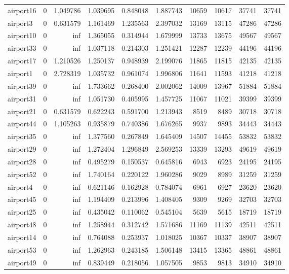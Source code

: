 \begin{longtable}{|l|r|r|r|r|r|r|r|r|r|}
airport16 & 0 & 1.049786 & 1.039695 & 0.848048 & 1.887743 & 10659 & 10617 & 37741 & 37741 \\
airport3 & 0 & 0.631579 & 1.161469 & 1.235563 & 2.397032 & 13169 & 13115 & 47286 & 47286 \\
airport10 & 0 & inf & 1.365055 & 0.314944 & 1.679999 & 13733 & 13675 & 49567 & 49567 \\
airport33 & 0 & inf & 1.037118 & 0.214303 & 1.251421 & 12287 & 12239 & 44196 & 44196 \\
airport17 & 0 & 1.210526 & 1.250137 & 0.948939 & 2.199076 & 11865 & 11815 & 42135 & 42135 \\
airport1 & 0 & 2.728319 & 1.035732 & 0.961074 & 1.996806 & 11641 & 11593 & 41218 & 41218 \\
airport39 & 0 & inf & 1.733662 & 0.268400 & 2.002062 & 14009 & 13967 & 51884 & 51884 \\
airport31 & 0 & inf & 1.051730 & 0.405995 & 1.457725 & 11067 & 11021 & 39399 & 39399 \\
airport21 & 0 & 0.631579 & 0.622243 & 0.591700 & 1.213943 & 8519 & 8489 & 30718 & 30718 \\
airport44 & 0 & 1.105263 & 0.935879 & 0.740386 & 1.676265 & 9937 & 9893 & 34443 & 34443 \\
airport35 & 0 & inf & 1.377560 & 0.267849 & 1.645409 & 14507 & 14455 & 53832 & 53832 \\
airport29 & 0 & inf & 1.272404 & 1.296849 & 2.569253 & 13339 & 13293 & 49619 & 49619 \\
airport28 & 0 & inf & 0.495279 & 0.150537 & 0.645816 & 6943 & 6923 & 24195 & 24195 \\
airport52 & 0 & inf & 1.740164 & 0.220122 & 1.960286 & 9029 & 8989 & 31259 & 31259 \\
airport4 & 0 & inf & 0.621146 & 0.162928 & 0.784074 & 6961 & 6927 & 23620 & 23620 \\
airport45 & 0 & inf & 1.194409 & 0.213996 & 1.408405 & 9309 & 9269 & 32703 & 32703 \\
airport25 & 0 & inf & 0.435042 & 0.110062 & 0.545104 & 5639 & 5615 & 18719 & 18719 \\
airport48 & 0 & inf & 1.258944 & 0.312742 & 1.571686 & 11169 & 11139 & 42511 & 42511 \\
airport14 & 0 & inf & 0.764088 & 0.253937 & 1.018025 & 10367 & 10337 & 38907 & 38907 \\
airport53 & 0 & inf & 1.262963 & 0.243185 & 1.506148 & 13415 & 13365 & 48861 & 48861 \\
airport49 & 0 & inf & 0.839449 & 0.218056 & 1.057505 & 9853 & 9813 & 34910 & 34910 \\

\end{longtable}
